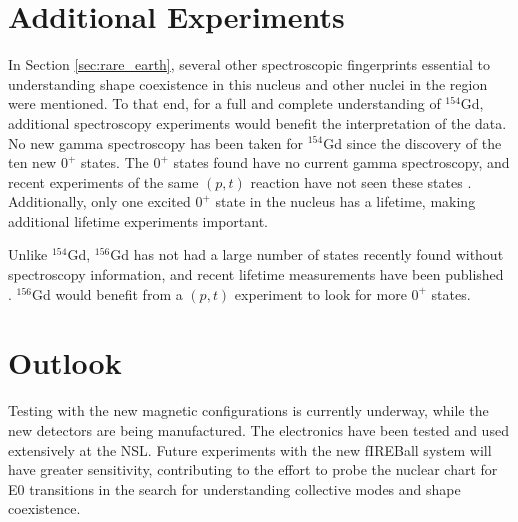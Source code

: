 \section{Additional Experiments}

In Section \ref{sec:rare_earth}, several other spectroscopic fingerprints essential to understanding shape coexistence in this nucleus and other nuclei in the region were mentioned. To that end, for a full and complete understanding of $^{154}$Gd, additional spectroscopy experiments would benefit the interpretation of the data. No new gamma spectroscopy has been taken for $^{154}$Gd since the discovery of the ten new $0^+$ states\citep{meyer06:_zeroplus}. The $0^+$ states found have no current gamma spectroscopy, and recent experiments of the same $(p,t)$ reaction have not seen these states \citep{allmond17:_154_pt}. Additionally, only one excited $0^+$ state in the nucleus has a lifetime, making additional lifetime experiments important.

Unlike $^{154}$Gd, $^{156}$Gd has not had a large number of states recently found without spectroscopy information, and recent lifetime measurements have been published \citep{aprahamian18:_156gd}. $^{156}$Gd would benefit from a $(p,t)$ experiment to look for more $0^+$ states.

\section{Outlook}

Testing with the new magnetic configurations is currently underway, while the new detectors are being manufactured. The electronics have been tested and used extensively at the NSL. Future experiments with the new fIREBall system will have greater sensitivity, contributing to the effort to probe the nuclear chart for E0 transitions in the search for understanding collective modes and shape coexistence.


